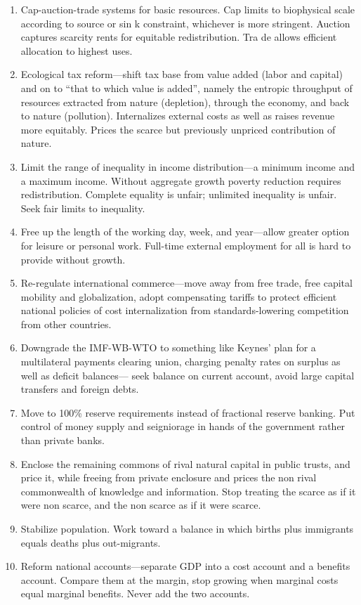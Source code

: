 \documentclass[
]{book}
\begin{document}
\begin{enumerate}
\def\labelenumi{\arabic{enumi}.}
\item
  Cap-auction-trade systems for basic resources. Cap limits to biophysical scale according to source or sin
  k constraint, whichever is more stringent. Auction captures scarcity rents for equitable redistribution. Tra
  de allows efficient allocation to highest uses.
\item
  Ecological tax reform---shift tax base from value added (labor and capital) and on to
  ``that to which value is added'', namely the entropic throughput of resources extracted
  from nature (depletion), through the economy, and back to nature (pollution).
  Internalizes external costs as well as raises revenue more equitably. Prices the scarce but
  previously unpriced contribution of nature.
\item
  Limit the range of inequality in income distribution---a minimum income and a
  maximum income. Without aggregate growth poverty reduction requires redistribution.
  Complete equality is unfair; unlimited inequality is unfair. Seek fair limits to inequality.
\item
  Free up the length of the working day, week, and year---allow greater option for
  leisure or personal work. Full-time external employment for all is hard to provide
  without growth.
\item
  Re-regulate international commerce---move away from free trade, free capital
  mobility and globalization, adopt compensating tariffs to protect efficient national
  policies of cost internalization from standards-lowering competition from other
  countries.
\item
  Downgrade the IMF-WB-WTO to something like Keynes' plan for a multilateral
  payments clearing union, charging penalty rates on surplus as well as deficit balances---
  seek balance on current account, avoid large capital transfers and foreign debts.
\item
  Move to 100\% reserve requirements instead of fractional reserve banking. Put control
  of money supply and seigniorage in hands of the government rather than private banks.
\item
  Enclose the remaining commons of rival natural capital in public trusts, and price
  it, while freeing from private enclosure and prices the non rival commonwealth of
  knowledge and information. Stop treating the scarce as if it were non scarce, and the non
  scarce as if it were scarce.
\item
  Stabilize population. Work toward a balance in which births plus immigrants equals
  deaths plus out-migrants.
\item
  Reform national accounts---separate GDP into a cost account and a benefits account.
  Compare them at the margin, stop growing when marginal costs equal marginal
  benefits. Never add the two accounts.
\end{enumerate}
\end{document}
